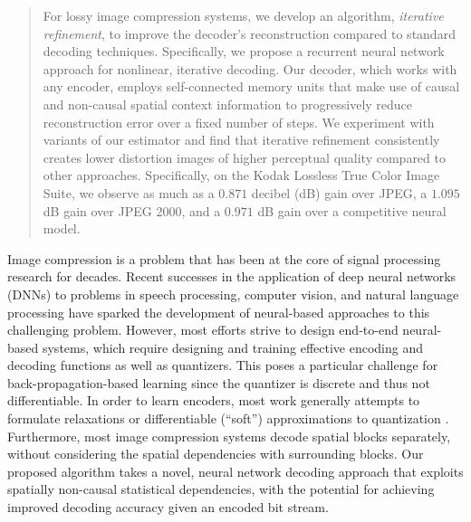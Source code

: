 \documentclass[smallabstract,smallcaptions]{dccpaper}
\begin{document}
\begin{abstract}
For lossy image compression systems, we develop an algorithm, \emph{iterative refinement}, to improve the decoder's reconstruction compared to standard decoding techniques. Specifically, we propose a recurrent neural network approach for nonlinear, iterative decoding. Our decoder, which works with any encoder, employs self-connected memory units that make use of causal and non-causal spatial context information to progressively reduce reconstruction error over a fixed number of steps. We experiment with variants of our estimator and find that iterative refinement consistently creates lower distortion images of higher perceptual quality compared to other approaches. Specifically, on the Kodak Lossless True Color Image Suite, we observe as much as a $0.871$ decibel (dB) gain over JPEG, a $1.095$ dB gain over JPEG 2000, and a $0.971$ dB gain over a competitive neural model.
\end{abstract}

\label{intro}
Image compression is a problem that has been at the core of signal processing research for decades. 
Recent successes in the application of deep neural networks (DNNs) to problems in speech processing,  computer vision, and natural language processing have sparked the development of neural-based approaches to this challenging problem. 
However, most efforts strive to design end-to-end neural-based systems, which require designing and training effective encoding and decoding functions as well as quantizers.
This poses a particular challenge for back-propagation-based learning since the quantizer is discrete and thus not differentiable. 
In order to learn encoders, most work generally attempts to formulate relaxations or differentiable (``soft'') approximations to quantization \cite{agustsson2017}. %
Furthermore, most image compression systems decode spatial blocks separately, without considering the spatial dependencies with surrounding blocks. Our proposed algorithm takes a novel, neural network decoding approach that exploits spatially non-causal statistical dependencies, with the potential for achieving improved decoding accuracy 
given an encoded bit stream. 
\end{document}
